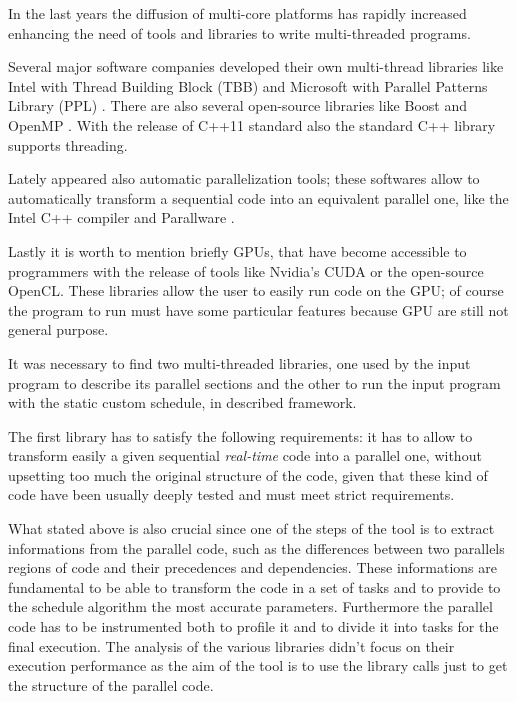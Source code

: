 \documentclass[a4paper,12pt,oneside]{book}
\begin{document}
In the last years the diffusion of multi-core platforms has rapidly increased enhancing the need of tools and libraries to write multi-threaded programs. 

Several major software companies developed their own multi-thread libraries like Intel with Thread Building Block (TBB) \cite{tbb} and Microsoft with Parallel Patterns Library (PPL) \cite{ppl}. There are also several open-source libraries like Boost \cite{boost} and OpenMP \cite{openmp}. With the release of C++11 standard also the standard C++ library supports threading.

Lately appeared also automatic parallelization tools; these softwares allow to automatically transform a sequential code into an equivalent parallel one, like the Intel C++ compiler \cite{icc} and Parallware \cite{parallware}.  

Lastly it is worth to mention briefly GPUs, that have become accessible to programmers with the release of tools like Nvidia's CUDA or the open-source OpenCL. These libraries allow the user to easily run code on the GPU; of course the program to run must have some particular features because GPU are still not general purpose. 

It was necessary to find two multi-threaded libraries, one used by the input program to describe its parallel sections and the other to run the input program with the static custom schedule, in described framework.

The first library has to satisfy the following requirements: it has to allow to transform easily a given sequential \emph{real-time} code into a parallel one, without upsetting too much the original structure of the code, given that these kind of code have been usually deeply tested and must meet strict requirements.

What stated above is also crucial since one of the steps of the tool is to extract informations from the parallel code, such as the differences between two parallels regions of code and their precedences and dependencies. These informations are fundamental to be able to transform the code in a set of tasks and to provide to the schedule algorithm the most accurate parameters. Furthermore the parallel code has to be instrumented both to profile it and to divide it into tasks for the final execution. The analysis of the various libraries didn’t focus on their execution performance as the aim of the tool is to use the library calls just to get the structure of the parallel code.
\end{document}
